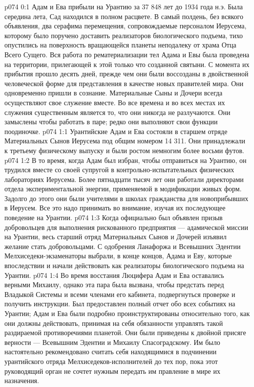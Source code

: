 \author{Солония}
\vs p074 0:1 Адам и Ева прибыли на Урантию за 37 848 лет до 1934 года н.э. Была середина лета, Сад находился в полном расцвете. В самый полдень, без всякого объявления, два серафима перемещения, сопровождаемые персоналом Иерусема, которому было поручено доставить реализаторов биологического подъема, тихо опустились на поверхность вращающейся планеты неподалеку от храма Отца Всего Сущего. Вся работа по рематериализации тел Адама и Евы была проведена на территории, прилегающей к этой только что созданной святыни. С момента их прибытия прошло десять дней, прежде чем они были воссозданы в двойственной человеческой форме для представления в качестве новых правителей мира. Они одновременно пришли в сознание. Материальные Сыны и Дочери всегда осуществляют свое служение вместе. Во все времена и во всех местах их служения существенным является то, что они никогда не разлучаются. Они замыслены чтобы работать в паре; редко они выполняют свои функции поодиночке.
\vs p074 1:1 Урантийские Адам и Ева состояли в старшем отряде Материальных Сынов Иерусема под общим номером 14 311. Они принадлежали к третьему физическому выпуску и были ростом немногим более восьми футов.
\vs p074 1:2 В то время, когда Адам был избран, чтобы отправиться на Урантию, он трудился вместе со своей супругой в контрольно\hyp{}испытательных физических лабораториях Иерусема. Более пятнадцати тысяч лет они работали директорами отдела экспериментальной энергии, применяемой в модификации живых форм. Задолго до этого они были учителями в школах гражданства для новоприбывших в Иерусем. Все это надо принимать во внимание, изучая их последующее поведение на Урантии.
\vs p074 1:3 Когда официально был объявлен призыв добровольцев для выполнения рискованного предприятия --- адамической миссии на Урантии, весь старший отряд Материальных Сынов и Дочерей изъявил желание стать добровольцами. С одобрения Ланафоржа и Всевышних Эдентии Мелхиседеки\hyp{}экзаменаторы выбрали, в конце концов, Адама и Еву, которые впоследствии и начали действовать как реализаторы биологического подъема на Урантии.
\vs p074 1:4 Во время восстания Люцифера Адам и Ева оставались верными Михаилу, однако эта пара была вызвана, чтобы предстать перед Владыкой Системы и всеми членами его кабинета, подвергнуться проверке и получить инструкции. Был предоставлен полный отчет обо всех событиях на Урантии; Адам и Ева были подробно проинструктированы относительно того, как они должны действовать, принимая на себя обязанности управлять такой раздираемой противоречиями планетой. Они были приведены к двойной присяге верности --- Всевышним Эдентии и Михаилу Спасоградскому. Им было настоятельно рекомендовано считать себя находящимися в подчинении урантийского отряда Мелхиседеков\hyp{}исполнителей до тех пор, пока этот руководящий орган не сочтет нужным передать им правление в мире их назначения.
